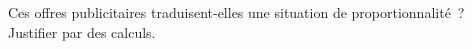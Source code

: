 \documentclass[exercice]{thedocument}%
\begin{document}
%
Ces offres publicitaires traduisent-elles une situation de proportionnalité~? Justifier par des calculs.
\vskip5pt
\end{document}
